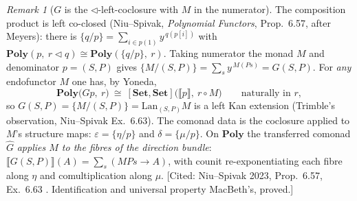 \documentclass[11pt,a4paper]{book}
\newcommand{\Set}{\mathbf{Set}}
\newcommand{\Poly}{\mathbf{Poly}}
\newcommand{\Ext}[1]{\llbracket #1 \rrbracket}
\theoremstyle{plain}
\theoremstyle{definition}
\theoremstyle{remark}
\newtheorem{Remark}[Theorem]{Remark}
\newcommand{\prov}[1]{\hfill\textsf{\footnotesize[#1]}}
\begin{document}
\begin{Remark}[$G$ is the $\triangleleft$-left-coclosure with $M$ in the numerator]
\label{rem:transfer-coclosure}
The composition product is left co-closed (Niu--Spivak, \emph{Polynomial Functors}, Prop.~6.57,
after Meyers): there is $\{q/p\}=\sum_{i\in p(1)}y^{\,q(p[i])}$ with
$\Poly(p,\ r\triangleleft q)\cong\Poly(\{q/p\},\ r)$. Taking numerator the monad $M$ and
denominator $p=(S,P)$ gives $\{M/(S,P)\}=\sum_{s}y^{\,M(P s)}=G(S,P)$. For \emph{any} endofunctor
$M$ one has, by Yoneda,
\[
  \Poly\bigl(G p,\ r\bigr)\ \cong\ [\Set,\Set]\bigl(\Ext p,\ r\circ M\bigr)
  \qquad\text{naturally in }r,
\]
so $G(S,P)=\{M/(S,P)\}=\mathrm{Lan}_{(S,P)}M$ is a left Kan extension (Trimble's observation,
Niu--Spivak Ex.~6.63). The comonad data is the coclosure applied to $M$'s structure maps:
$\varepsilon=\{\eta/p\}$ and $\delta=\{\mu/p\}$. On $\Poly$ the transferred comonad
$\hat G$ \emph{applies $M$ to the fibres of the direction bundle}:
$\Ext{G(S,P)}(A)=\sum_{s}(MP s\to A)$, with counit re-exponentiating each fibre along $\eta$ and
comultiplication along $\mu$.
\prov{Cited: Niu--Spivak 2023, Prop.~6.57, Ex.~6.63 \cite{NiuSpivak23}. Identification and
universal property MacBeth's, proved.}
\end{Remark}
\end{document}
